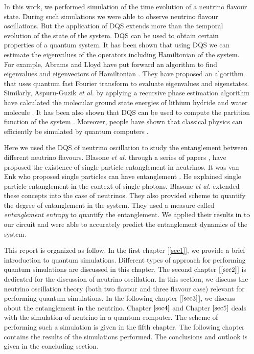 \documentclass[12pt,a4paper]{report}
\begin{document}
In this work, we performed simulation of the time evolution of a neutrino flavour state. During such simulations we were able to observe neutrino flavour oscillations. But the application of DQS extends more than the temporal evolution of the state of the system. DQS can be used to obtain certain properties of a quantum system. It has been shown that using DQS we can estimate the eigenvalues of the operators including Hamiltonian of the system. For example, Abrams and Lloyd have put forward an algorithm to find eigenvalues and eigenvectors of Hamiltonian \cite{abrams}. They have proposed an algorithm that uses quantum fast Fourier transform to evaluate eigenvalues and eigenstates. Similarly, Aspuru-Guzik \emph{et al.} by applying a recursive phase estimation algorithm have calculated the molecular ground state energies of lithium hydride and water molecule \cite{aspuru}. It has been also shown that DQS can be used to compute the partition function of the system \cite{lidar}. Moreover, people have shown that classical physics can efficiently be simulated by quantum computers \cite{meyer}\cite{sinha}. 

Here we used the DQS of neutrino oscillation to study the entanglement between different neutrino flavours. Blasone \emph{et al.} through a series of papers \cite{blasone2008}\cite{blasone2009}\cite{blasone2010}\cite{blasone2014}, have proposed the existence of single particle entanglement in neutrinos. It was van Enk who proposed single particles can have entanglement \cite{vanenk2003}\cite{vanenk2005}\cite{vanenk2006}. He explained single particle entanglement in the context of single photons. Blasone \emph{et al.} extended these concepts into the case of neutrinos. They also provided scheme to quantify the degree of entanglement in the system. They used a measure called \emph{entanglement entropy} to quantify the entanglement. We applied their results in to our circuit and were able to accurately predict the entanglement dynamics of the system. 

This report is organized as follow. In the first chapter [\ref{sec1}], we provide a brief introduction to quantum simulations. Different types of approach for performing quantum simulations are discussed in this chapter. The second chapter [$\ref{sec2}$] is dedicated for the discussion of neutrino oscillation. In this section, we discuss the neutrino oscillation theory (both two flavour and three flavour case) relevant for performing quantum simulations. In the following chapter [$\ref{sec3}$], we discuss about the entanglement in the neutrino. Chapter $\ref{sec4}$ and Chapter $\ref{sec5}$ deals with the simulation of neutrino in a quantum computer. The scheme of performing such a simulation is given in the fifth chapter. The following chapter contains the results of the simulations performed. The conclusions and outlook is given in the concluding section.
\end{document}
